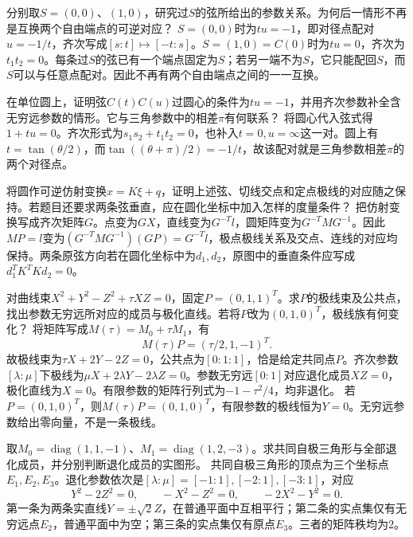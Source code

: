分别取\(S=(0,0)\)、\((1,0)\)，研究过\(S\)的弦所给出的参数关系。为何后一情形不再是互换两个自由端点的可逆对应？
\solutionanswer
\(S=(0,0)\)时为\(tu=-1\)，即对径点配对\(u=-1/t\)，齐次写成\([s:t]\mapsto[-t:s]\)。\(S=(1,0)=C(0)\)时为\(tu=0\)，齐次为\(t_1t_2=0\)。每条过\(S\)的弦已有一个端点固定为\(S\)；若另一端不为\(S\)，它只能配回\(S\)，而\(S\)可以与任意点配对。因此不再有两个自由端点之间的一一互换。


在单位圆上，证明弦\(C(t)C(u)\)过圆心的条件为\(tu=-1\)，并用齐次参数补全含无穷远参数的情形。它与三角参数中的相差\(\pi\)有何联系？
\solutionanswer
将圆心代入弦式得\(1+tu=0\)。齐次形式为\(s_1s_2+t_1t_2=0\)，也补入\(t=0,u=\infty\)这一对。圆上有\(t=\tan(\theta/2)\)，而\(\tan((\theta+\pi)/2)=-1/t\)，故该配对就是三角参数相差\(\pi\)的两个对径点。


将圆作可逆仿射变换\(x=K\xi+q\)，证明上述弦、切线交点和定点极线的对应随之保持。若题目还要求两条弦垂直，应在圆化坐标中加入怎样的度量条件？
\solutionanswer
把仿射变换写成齐次矩阵\(G\)。点变为\(GX\)，直线变为\(G^{-T}l\)，圆矩阵变为\(G^{-T}MG^{-1}\)。因此\(MP=l\)变为\((G^{-T}MG^{-1})(GP)=G^{-T}l\)，极点极线关系及交点、连线的对应均保持。两条原弦方向若在圆化坐标中为\(d_1,d_2\)，原图中的垂直条件应写成\(d_1^TK^TKd_2=0\)。


对曲线束\(X^2+Y^2-Z^2+\tau XZ=0\)，固定\(P=(0,1,1)^T\)。求\(P\)的极线束及公共点，找出参数无穷远所对应的成员与极化直线。若将\(P\)改为\((0,1,0)^T\)，极线族有何变化？
\solutionanswer
将矩阵写成\(M(\tau)=M_0+\tau M_1\)，有
\[
 M(\tau)P=(\tau/2,1,-1)^T.
\]
故极线束为\(\tau X+2Y-2Z=0\)，公共点为\([0:1:1]\)，恰是给定共同点\(P\)。齐次参数\([\lambda:\mu]\)下极线为\(\mu X+2\lambda Y-2\lambda Z=0\)。参数无穷远\([0:1]\)对应退化成员\(XZ=0\)，极化直线为\(X=0\)。有限参数的矩阵行列式为\(-1-\tau^2/4\)，均非退化。
若\(P=(0,1,0)^T\)，则\(M(\tau)P=(0,1,0)^T\)，有限参数的极线恒为\(Y=0\)。无穷远参数给出零向量，不是一条极线。


取\(M_0=\operatorname{diag}(1,1,-1)\)、\(M_1=\operatorname{diag}(1,2,-3)\)。求共同自极三角形与全部退化成员，并分别判断退化成员的实图形。
\solutionanswer
共同自极三角形的顶点为三个坐标点\(E_1,E_2,E_3\)。退化参数依次是\([\lambda:\mu]=[-1:1],[-2:1],[-3:1]\)，对应
\[
 Y^2-2Z^2=0,\qquad -X^2-Z^2=0,\qquad -2X^2-Y^2=0.
\]
第一条为两条实直线\(Y=\pm\sqrt2Z\)，在普通平面中互相平行；第二条的实点集仅有无穷远点\(E_2\)，普通平面中为空；第三条的实点集仅有原点\(E_3\)。三者的矩阵秩均为\(2\)。


